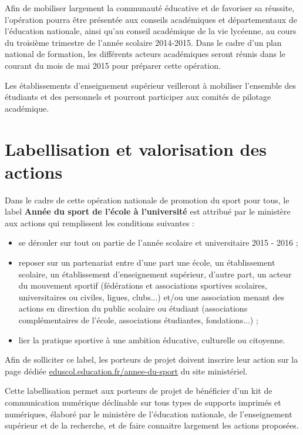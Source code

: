 Afin de mobiliser largement la communauté éducative et de favoriser sa réussite, l’opération pourra être présentée aux conseils académiques et départementaux de l’éducation nationale, ainsi qu’au conseil académique de la vie lycéenne, au cours du troisième trimestre de l’année scolaire 2014-2015. Dans le cadre d’un plan national de formation, les différents acteurs académiques seront réunis dans le courant du mois de mai 2015 pour préparer cette opération.

Les établissements d’enseignement supérieur veilleront à mobiliser l’ensemble des étudiants et des personnels et pourront participer aux comités de pilotage académique.

\section{Labellisation et valorisation des actions}
Dans le cadre de cette opération nationale de promotion du sport pour tous, le label \textbf{Année du sport de l’école à l’université} est attribué par le ministère aux actions qui remplissent les conditions suivantes :
\begin{itemize}
\item se dérouler sur tout ou partie de l’année scolaire et universitaire 2015 - 2016 ;
\item reposer sur un partenariat entre d’une part une école, un établissement scolaire, un établissement d’enseignement supérieur, d’autre part, un acteur du mouvement sportif (fédérations et associations sportives scolaires, universitaires ou civiles, ligues, clubs...) et/ou une association menant des actions en direction du public scolaire ou étudiant (associations complémentaires de l’école, associations étudiantes, fondations...) ;
\item lier la pratique sportive à une ambition éducative, culturelle ou citoyenne.
\end{itemize}

Afin de solliciter ce label, les porteurs de projet doivent inscrire leur action sur la page dédiée \href{http://www.eduscol.education.fr/annee-du-sport}{eduscol.education.fr/annee-du-sport} du site ministériel.

Cette labellisation permet aux porteurs de projet de bénéficier d’un kit de communication numérique déclinable sur tous types de supports imprimés et numériques, élaboré par le ministère de l’éducation nationale, de l’enseignement supérieur et de la recherche, et de faire connaitre largement les actions proposées.

